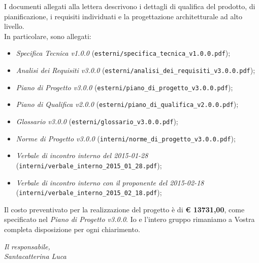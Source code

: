\documentclass[10pt,a4paper,sans]{moderncv}        %
\begin{document}
\vfill
I documenti allegati alla lettera descrivono i dettagli di qualifica del prodotto, di pianificazione, i requisiti individuati e la progettazione architetturale ad alto livello.\\ \vfill
In particolare, sono allegati:
	\begin{itemize}
		\item \textit{Specifica Tecnica v1.0.0} ({\verb!esterni/specifica_tecnica_v1.0.0.pdf!});
		\item \textit{Analisi dei Requisiti v3.0.0} ({\verb!esterni/analisi_dei_requisiti_v3.0.0.pdf!});
		\item \textit{Piano di Progetto v3.0.0} ({\verb!esterni/piano_di_progetto_v3.0.0.pdf!});
		\item \textit{Piano di Qualifica v2.0.0} ({\verb!esterni/piano_di_qualifica_v2.0.0.pdf!});
		\item \textit{Glossario v3.0.0} ({\verb!esterni/glossario_v3.0.0.pdf!});
		\item \textit{Norme di Progetto v3.0.0} ({\verb!interni/norme_di_progetto_v3.0.0.pdf!});
		\item \textit{Verbale di incontro interno del 2015-01-28} ({\verb!interni/verbale_interno_2015_01_28.pdf!});
		\item \textit{Verbale di incontro interno con il proponente del 2015-02-18} ({\verb!interni/verbale_interno_2015_02_18.pdf!});
	\end{itemize}
\noindent

Il costo preventivato per la realizzazione del progetto è di \textbf{\euro{} 13731,00}, come specificato nel \textit{Piano di Progetto v3.0.0}. \newline Io e l'intero gruppo rimaniamo a Vostra completa disposizione per ogni chiarimento.
	\begin{flushright}
		\textit{Il responsabile,}\\ 
		\textit{Santacatterina Luca}
	\end{flushright}
\end{document}
